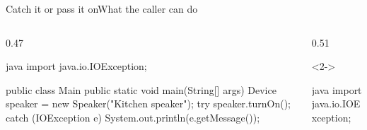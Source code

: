 \documentclass[\deckoptions]{beamer}
\begin{document}
\begin{frame}[fragile]{Catch it or pass it on}{What the caller can do}
  \begin{columns}[T, onlytextwidth]
    \begin{column}{0.47\textwidth}
\begin{codeblock}[steps={6-10|none|none|}, packed, marks={6-10/1}]{java}
import java.io.IOException;

public class Main {
    public static void main(String[] args) {
        Device speaker = new Speaker("Kitchen speaker");
        try {
            speaker.turnOn();
        } catch (IOException e) {
            System.out.println(e.getMessage());
        }
    }
}
\end{codeblock}
    \end{column}
    \begin{column}{0.51\textwidth}
      \begin{uncoverenv}<2->
\begin{codeblock}[steps={|4|4|}, packed, marks={4/2, 4/3/warn}, marks from=2]{java}
import java.io.IOException;


\end{codeblock}
\end{uncoverenv}
\end{column}
\end{columns}
\end{frame}
\end{document}
